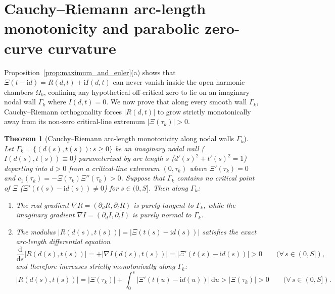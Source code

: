 \documentclass[11pt,a4paper,reqno]{amsart}
\newtheorem{theorem}{Theorem}[section]
\theoremstyle{definition}
\theoremstyle{remark}
\numberwithin{equation}{section}
\newcommand{\dd}{\mathrm{d}}
\newcommand{\ii}{\mathrm{i}}
\begin{document}
\section{Cauchy--Riemann arc-length monotonicity and parabolic zero-curve curvature}\label{sec:monotonicity_curvature}

Proposition~\ref{prop:maximum_and_euler}(a) shows that $\Xi(t-\ii d) = R(d,t) + \ii I(d,t)$ can never vanish inside the open harmonic chambers $\Omega_k$, confining any hypothetical off-critical zero to lie on an imaginary nodal wall $\Gamma_k$ where $I(d,t) = 0$. We now prove that along every smooth wall $\Gamma_k$, Cauchy--Riemann orthogonality forces $|R(d,t)|$ to grow strictly monotonically away from its non-zero critical-line extremum $|\Xi(\tau_k)| > 0$.

\begin{theorem}[Cauchy--Riemann arc-length monotonicity along nodal walls $\Gamma_k$]\label{thm:cr_monotonicity}
Let $\Gamma_k = \{(d(s), t(s)) : s \ge 0\}$ be an imaginary nodal wall ($I(d(s), t(s)) \equiv 0$) parameterized by arc length $s$ ($d'(s)^2 + t'(s)^2 = 1$) departing into $d > 0$ from a critical-line extremum $(0, \tau_k)$ where $\Xi'(\tau_k) = 0$ and $c_1(\tau_k) = -\Xi(\tau_k)\Xi''(\tau_k) > 0$. Suppose that $\Gamma_k$ contains no critical point of $\Xi$ ($\Xi'(t(s)-\ii d(s)) \neq 0$) for $s \in (0, S]$. Then along $\Gamma_k$:
\begin{enumerate}
\item[\textup{(a)}] The real gradient $\nabla R = (\partial_d R, \partial_t R)$ is purely tangent to $\Gamma_k$, while the imaginary gradient $\nabla I = (\partial_d I, \partial_t I)$ is purely normal to $\Gamma_k$.
\item[\textup{(b)}] The modulus $|R(d(s), t(s))| = |\Xi(t(s)-\ii d(s))|$ satisfies the exact arc-length differential equation
\begin{equation}\label{eq:dabsR_ds}
\frac{\dd}{\dd s}\big|R(d(s), t(s))\big| = +\big|\nabla I(d(s), t(s))\big| = \big|\Xi'(t(s) - \ii d(s))\big| > 0 \qquad (\forall\, s \in (0, S]),
\end{equation}
and therefore increases strictly monotonically along $\Gamma_k$:
\begin{equation}\label{eq:absR_integral_growth}
\big|R(d(s), t(s))\big| = \big|\Xi(\tau_k)\big| + \int_0^s \big|\Xi'(t(u) - \ii d(u))\big|\,\dd u > \big|\Xi(\tau_k)\big| > 0 \qquad (\forall\, s \in (0, S]).
\end{equation}
\end{enumerate}
\end{theorem}
\end{document}
